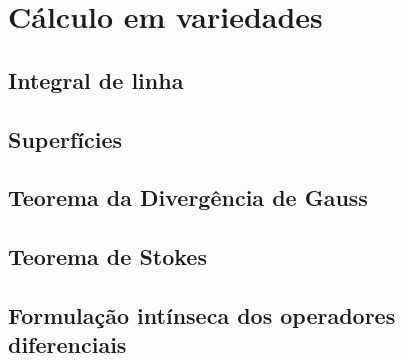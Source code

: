 \documentclass[12pt]{book}
\begin{document}

\part{Cálculo em variedades}


\chapter{Integral de linha}
\chapter{Superfícies}
\chapter{Teorema da Divergência de Gauss}
\chapter{Teorema de Stokes}
\chapter{Formulação intínseca dos operadores diferenciais}
















\backmatter





\printindex
\end{document}
